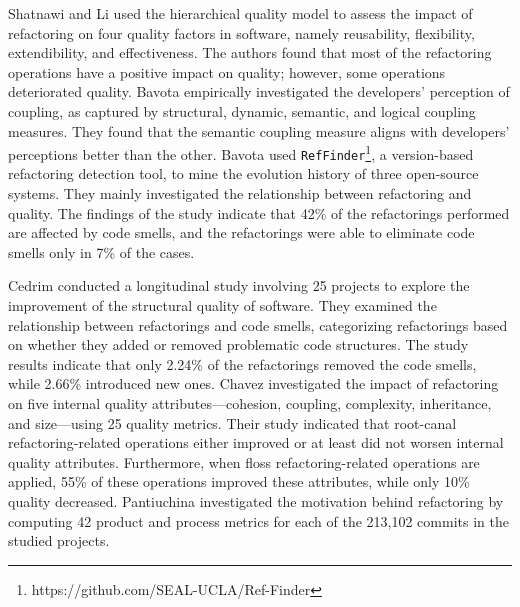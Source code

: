 Shatnawi and Li \citep{shatnawi2011empirical} used the hierarchical quality model to assess the impact of refactoring on four quality factors in software, namely reusability, flexibility, extendibility, and effectiveness. The authors found that most of the refactoring operations have a positive impact on quality; however, some operations deteriorated quality. Bavota \etal empirically investigated the developers' perception of coupling, as captured by structural, dynamic, semantic, and logical coupling measures. They found that the semantic coupling measure aligns with developers' perceptions better than the other. Bavota \etal \citep{bavota2015experimental} used \texttt{RefFinder}\footnote{https://github.com/SEAL-UCLA/Ref-Finder}, 
a version-based refactoring detection tool, to mine the evolution history of three open-source systems. They mainly investigated the relationship between refactoring and quality. The findings of the study indicate that 42\% of the refactorings performed are affected by code smells, and the refactorings were able to eliminate code smells only in 7\% of the cases. 

Cedrim \etal \citep{cedrim2016does} conducted a longitudinal study involving 25 projects to explore the improvement of the structural quality of software. They examined the relationship between refactorings and code smells, categorizing refactorings based on whether they added or removed problematic code structures. The study results indicate that only 2.24\% of the refactorings removed the code smells, while 2.66\% introduced new ones. Chavez \etal \citep{chavez2017does} investigated the impact of refactoring on five internal quality attributes—cohesion, coupling, complexity, inheritance, and size—using 25 quality metrics. Their study indicated that root-canal refactoring-related operations either improved or at least did not worsen internal quality attributes. Furthermore, when floss refactoring-related operations are applied, 55\% of these operations improved these attributes, while only 10\% quality decreased. Pantiuchina \etal \citep{pantiuchina2020developers} investigated the motivation behind refactoring by computing 42 product and process metrics for each of the 213,102 commits in
the studied projects.

